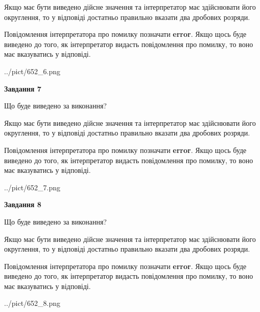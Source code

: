 \documentclass[12pt, ukrainian]{article}
\begin{document}
{\begin {Large}
Якщо має бути виведено дійсне значення та інтерпретатор має здійснювати його округлення, 
то у відповіді достатньо правильно вказати два дробових розряди.

Повідомлення інтерпретатора про помилку позначати \textbf{error}.
Якщо щось буде виведено до того, як інтерпретатор видасть повідомлення про помилку, 
то воно має вказуватись у відповіді. \par

\begin{center}
	{../pict/652_6.png}
\end{center}
\newpage

{\begin {center}\textbf{Завдання 7}\end {center}}\par
Що буде виведено за виконання? \par

Якщо має бути виведено дійсне значення та інтерпретатор має здійснювати його округлення, 
то у відповіді достатньо правильно вказати два дробових розряди.

Повідомлення інтерпретатора про помилку позначати \textbf{error}.
Якщо щось буде виведено до того, як інтерпретатор видасть повідомлення про помилку, 
то воно має вказуватись у відповіді. \par

\begin{center}
	{../pict/652_7.png}
\end{center}
\newpage

{\begin {center}\textbf{Завдання 8}\end {center}}\par
Що буде виведено за виконання? \par

Якщо має бути виведено дійсне значення та інтерпретатор має здійснювати його округлення, 
то у відповіді достатньо правильно вказати два дробових розряди.

Повідомлення інтерпретатора про помилку позначати \textbf{error}.
Якщо щось буде виведено до того, як інтерпретатор видасть повідомлення про помилку, 
то воно має вказуватись у відповіді. \par

\begin{center}
	{../pict/652_8.png}
\end{center}
\newpage


\end{Large}}
\end{document}
